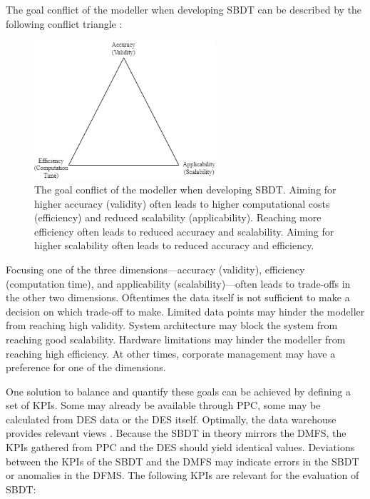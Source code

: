 The goal conflict of the modeller when developing SBDT can be described by the following conflict triangle \autocite{robinson2014simulation,balci2012life}:

\begin{figure}[htbp]
  \centering
  \includegraphics[width=0.6\textwidth]{figures/goals.png}
  \caption{The goal conflict of the modeller when developing SBDT. Aiming for higher accuracy (validity) often leads to higher computational costs (efficiency) and reduced scalability (applicability). Reaching more efficiency often leads to reduced accuracy and scalability. Aiming for higher scalability often leads to reduced accuracy and efficiency.}
  \label{fig:goals}
\end{figure}

Focusing one of the three dimensions—accuracy (validity), efficiency (computation time), and applicability (scalability)—often leads to trade-offs in the other two dimensions. Oftentimes the data itself is not sufficient to make a decision on which trade-off to make. Limited data points may hinder the modeller from reaching high validity. System architecture may block the system from reaching good scalability. Hardware limitations may hinder the modeller from reaching high efficiency.
At other times, corporate management may have a preference for one of the dimensions.

One solution to balance and quantify these goals can be achieved by defining a set of KPIs. Some may already be available through PPC, some may be calculated from DES data or the DES itself. Optimally, the data warehouse provides relevant views \autocite{cui2020manufacturing}. Because the SBDT in theory mirrors the DMFS, the KPIs gathered from PPC and the DES should yield identical values. Deviations between the KPIs of the SBDT and the DMFS may indicate errors in the SBDT or anomalies in the DFMS. The following KPIs are relevant for the evaluation of SBDT:

